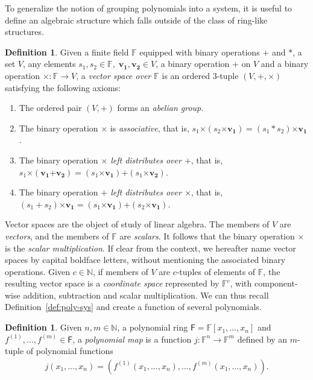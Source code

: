 \documentclass[12pt, a4paper, oneside]{memoir}
\theoremstyle{definition}
\newtheorem{definition}[theorem]{Definition}
\begin{document}
To generalize the notion of grouping polynomials into a system, it is useful to define an algebraic structure which falls outside of the class of ring-like structures.

\begin{definition}
  Given a finite field $\mathbb{F}$ equipped with binary operations $+$ and $\ast$, a set $V$, any elements $s_{1}, s_{2} \in \mathbb{F},\; \mathbf{v_{1}}, \mathbf{v_{2}} \in V$, a binary operation $\bm{+}$ on $V$ and a binary operation $\bm{\times} : \mathbb{F} \to V$, a \emph{vector space over $\mathbb{F}$} is an ordered $3$-tuple $(V, \bm{+}, \bm{\times})$ satisfying the following axioms:
  
  \begin{enumerate}
    \item The ordered pair $(V, \bm{+})$ forms an \emph{abelian group}.
    \item The binary operation $\bm{\times}$ is \emph{associative}, that is, $s_{1} \bm{\times} (s_{2} \bm{\times} \mathbf{v_{1}}) = (s_{1} \ast s_{2}) \bm{\times} \mathbf{v_{1}}$.
    \item The binary operation \emph{$\bm{\times}$ left distributes over $\bm{+}$}, that is, $s_{1} \bm{\times} (\mathbf{v_{1}} \bm{+} \mathbf{v_{2}}) = (s_{1} \bm{\times} \mathbf{v_{1}}) \bm{+} (s_{1} \bm{\times} \mathbf{v_{2}})$.
    \item The binary operation \emph{$\bm{+}$ left distributes over $\bm{\times}$}, that is, $(s_{1} + s_{2}) \bm{\times} \mathbf{v_{1}} = (s_{1} \bm{\times} \mathbf{v_{1}}) \bm{+} (s_{2} \bm{\times} \mathbf{v_{1}})$.
  \end{enumerate}
\end{definition}

Vector spaces are the object of study of linear algebra. The members of $V$ are \emph{vectors}, and the members of $\mathbb{F}$ are \emph{scalars}. It follows that the binary operation $\bm{\times}$ is the \emph{scalar multiplication}. If clear from the context, we hereafter name vector spaces by capital boldface letters, without mentioning the associated binary operations. Given $c \in \mathbb{N}$, if members of $V$ are $c$-tuples of elements of $\mathbb{F}$, the resulting vector space is a \emph{coordinate space} represented by $\mathbb{F}^{c}$, with component-wise addition, subtraction and scalar multiplication. We can thus recall Definition~\ref{def:poly-sys} and create a function of several polynomials.

\begin{definition}\label{def:poly-map}
  Given $n, m \in \mathbb{N}$, a polynomial ring $\mathsf{F} = \mathbb{F}[x_{1}, \dots, x_{n}]$ and $f^{(1)}, \dots, f^{(m)} \in \mathsf{F}$, a \emph{polynomial map} is a function $j : \mathbb{F}^{n} \to \mathbb{F}^{m}$ defined by an $m$-tuple of polynomial functions
  \begin{align}
    j(x_{1}, \dots, x_{n}) = (f^{(1)}(x_{1}, \dots, x_{n}), \dots, f^{(m)}(x_{1}, \dots, x_{n})).
  \end{align}
\end{definition}
\end{document}
